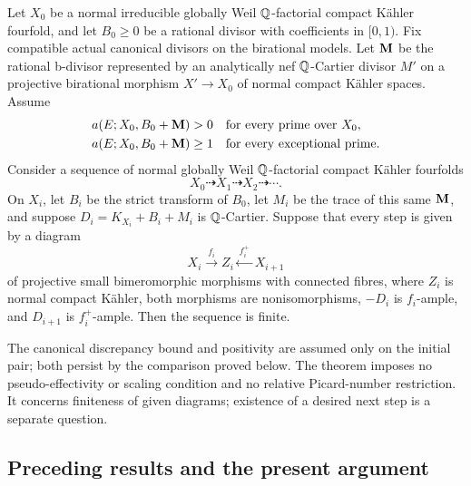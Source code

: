 \begin{theorem}\label{thm:termination}
Let $X_0$ be a normal irreducible globally Weil $\mathbb Q$-factorial compact
K\"ahler fourfold, and let $B_0\geq0$ be a rational divisor with
coefficients in $[0,1)$. Fix compatible actual canonical divisors on
the birational models. Let $\mathbf M$ be the rational b-divisor represented
by an analytically nef $\mathbb Q$-Cartier divisor $M'$ on a projective
birational morphism $X'\to X_0$ of normal compact K\"ahler spaces.
Assume
\[
 \begin{aligned}
 a(E;X_0,B_0+\mathbf M)&>0&&\text{for every prime over $X_0$},\\
 a(E;X_0,B_0+\mathbf M)&\geq1&&\text{for every exceptional prime}.
 \end{aligned}
\]
Consider a sequence of normal globally Weil $\mathbb Q$-factorial compact
K\"ahler fourfolds
\[
 X_0\dashrightarrow X_1\dashrightarrow X_2\dashrightarrow\cdots .
\]
On $X_i$, let $B_i$ be the strict transform of $B_0$, let $M_i$ be
the trace of this same $\mathbf M$, and suppose
$D_i=K_{X_i}+B_i+M_i$ is $\mathbb Q$-Cartier. Suppose that every step is
given by a diagram
\begin{equation}\label{eq:step-diagram}
 X_i\xrightarrow{\ f_i\ }Z_i
       \xleftarrow{\ f_i^+\ }X_{i+1}
\end{equation}
of projective small bimeromorphic morphisms with connected fibres,
where $Z_i$ is normal compact K\"ahler, both morphisms are
nonisomorphisms, $-D_i$ is $f_i$-ample, and $D_{i+1}$ is
$f_i^+$-ample. Then the sequence is finite.
\end{theorem}

The canonical discrepancy bound and positivity are assumed only on
the initial pair; both persist by the comparison proved below.
The theorem imposes no pseudo-effectivity or scaling condition and
no relative Picard-number restriction. It concerns finiteness of
given diagrams; existence of a desired next step is a separate question.

\subsection{Preceding results and the present argument}

